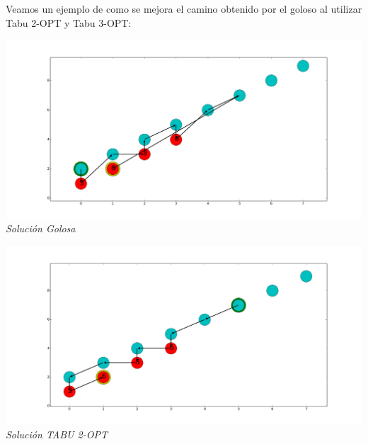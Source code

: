 Veamos un ejemplo de como se mejora el camino obtenido por el goloso al utilizar Tabu 2-OPT y Tabu 3-OPT:

\vspace*{0.3cm} \vspace*{0.3cm}
  \begin{center}
 \includegraphics[scale=0.3]{./EJ4/fam6goloso.png}\\
 {            \textit{Soluci\'on Golosa}}
  \end{center}
  \vspace*{0.3cm}

\vspace*{0.3cm} \vspace*{0.3cm}
  \begin{center}
 \includegraphics[scale=0.3]{./EJ4/fam62opt.png}\\
 {            \textit{Soluci\'on TABU 2-OPT}}
  \end{center}
  \vspace*{0.3cm}


